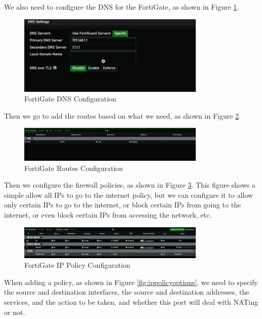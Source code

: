 \documentclass[12pt]{report}
\begin{document}
We also need to configure the DNS for the FortiGate, as shown in Figure \ref{fig:DNScfg}.
\begin{figure}
    \centering
    \includegraphics[width=0.8\textwidth]{images/Implementation/dns.png}
    \caption{FortiGate DNS Configuration}
    \label{fig:DNScfg}
\end{figure}
Then we go to add the routes based on what we need, as shown in Figure \ref{fig:routes}.
\begin{figure}
    \centering
    \includegraphics[width=0.8\textwidth]{images/Implementation/routes.png}
    \caption{FortiGate Routes Configuration}
    \label{fig:routes}
\end{figure}
Then we configure the firewall policies, as shown in Figure \ref{fig:ippolicy}. This figure shows a simple allow all IPs to go to the internet policy, but we can configure it to allow only certain IPs to go to the internet, or block certain IPs from going to the internet, or even block certain IPs from accessing the network, etc. 
\begin{figure}
    \centering
    \includegraphics[width=0.8\textwidth]{images/Implementation/ippolicy.png}
    \caption{FortiGate IP Policy Configuration}
    \label{fig:ippolicy}
\end{figure}
When adding a policy, as shown in Figure \ref{fig:ippolicyoptions}, we need to specify the source and destination interfaces, the source and destination addresses, the services, and the action to be taken, and whether this port will deal with NATing or not.
\end{document}
